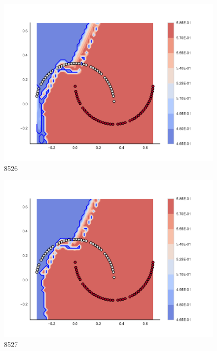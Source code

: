 \begin{subfigure}[b]{0.09\textwidth}
    \includegraphics[clip, trim=2.35cm 1.75cm 4.5cm 0cm,width=\textwidth]{img/convergence/8526.pdf}
    \caption{8526}
    \label{fig:convergence_8526}
\end{subfigure}
%
\begin{subfigure}[b]{0.09\textwidth}
    \includegraphics[clip, trim=2.35cm 1.75cm 4.5cm 0cm,width=\textwidth]{img/convergence/8527.pdf}
    \caption{8527}
    \label{fig:convergence_8527}
\end{subfigure}
%

